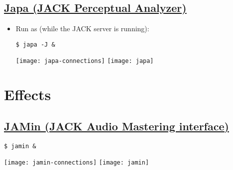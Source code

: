 

\section{\href{http://www.kokkinizita.net/linuxaudio/}{Japa (JACK Perceptual Analyzer)}}

\begin{itemize}
\item Run as (while the JACK server is running):
\begin{verbatim}
$ japa -J &
\end{verbatim}
  \begin{center}
    \texttt{[image: japa-connections]}
    \texttt{[image: japa]}
  \end{center}
\end{itemize}


\chapter{Effects}

\section{\href{http://jamin.sourceforge.net}{JAMin (JACK Audio Mastering interface)}}

\begin{verbatim}
$ jamin &
\end{verbatim}
\begin{center}
  \texttt{[image: jamin-connections]}
  \texttt{[image: jamin]}
\end{center}





